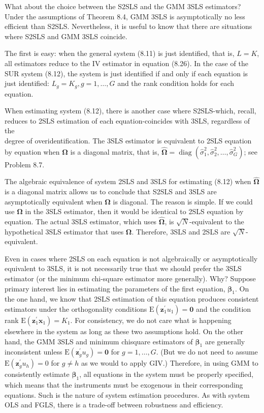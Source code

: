 \documentclass[10pt]{article}
\begin{document}
What about the choice between the S2SLS and the GMM 3SLS estimators? Under the assumptions of Theorem 8.4, GMM 3SLS is asymptotically no less efficient than S2SLS. Nevertheless, it is useful to know that there are situations where S2SLS and GMM 3SLS coincide.

The first is easy: when the general system (8.11) is just identified, that is, $L=K$, all estimators reduce to the IV estimator in equation (8.26). In the case of the SUR system (8.12), the system is just identified if and only if each equation is just identified: $L_{g}=K_{g}, g=1, \ldots, G$ and the rank condition holds for each equation.

When estimating system (8.12), there is another case where S2SLS-which, recall, reduces to 2SLS estimation of each equation-coincides with 3SLS, regardless of the\\
degree of overidentification. The 3SLS estimator is equivalent to 2SLS equation by equation when $\hat{\boldsymbol{\Omega}}$ is a diagonal matrix, that is, $\hat{\boldsymbol{\Omega}}=\operatorname{diag}\left(\hat{\sigma}_{1}^{2}, \hat{\sigma}_{2}^{2}, \ldots, \hat{\sigma}_{G}^{2}\right)$; see Problem 8.7.

The algebraic equivalence of system 2SLS and 3SLS for estimating (8.12) when $\hat{\boldsymbol{\Omega}}$ is a diagonal matrix allows us to conclude that S2SLS and 3SLS are asymptotically equivalent when $\boldsymbol{\Omega}$ is diagonal. The reason is simple. If we could use $\boldsymbol{\Omega}$ in the 3SLS estimator, then it would be identical to 2SLS equation by equation. The actual 3SLS estimator, which uses $\hat{\boldsymbol{\Omega}}$, is $\sqrt{N}$-equivalent to the hypothetical 3SLS estimator that uses $\boldsymbol{\Omega}$. Therefore, 3SLS and 2SLS are $\sqrt{N}$-equivalent.

Even in cases where 2SLS on each equation is not algebraically or asymptotically equivalent to 3SLS, it is not necessarily true that we should prefer the 3SLS estimator (or the minimum chi-square estimator more generally). Why? Suppose primary interest lies in estimating the parameters of the first equation, $\boldsymbol{\beta}_{1}$. On the one hand, we know that 2SLS estimation of this equation produces consistent estimators under the orthogonality conditions $\mathrm{E}\left(\mathbf{z}_{1}^{\prime} u_{1}\right)=\mathbf{0}$ and the condition rank $\mathrm{E}\left(\mathbf{z}_{1}^{\prime} \mathbf{x}_{1}\right)=K_{1}$. For consistency, we do not care what is happening elsewhere in the system as long as these two assumptions hold. On the other hand, the GMM 3SLS and minimum chisquare estimators of $\boldsymbol{\beta}_{1}$ are generally inconsistent unless $\mathrm{E}\left(\mathbf{z}_{g}^{\prime} u_{g}\right)=\mathbf{0}$ for $g=1, \ldots, G$. (But we do not need to assume $\mathrm{E}\left(\mathbf{z}_{g}^{\prime} u_{h}\right)=0$ for $g \neq h$ as we would to apply GIV.) Therefore, in using GMM to consistently estimate $\boldsymbol{\beta}_{1}$, all equations in the system must be properly specified, which means that the instruments must be exogenous in their corresponding equations. Such is the nature of system estimation procedures. As with system OLS and FGLS, there is a trade-off between robustness and efficiency.
\end{document}
